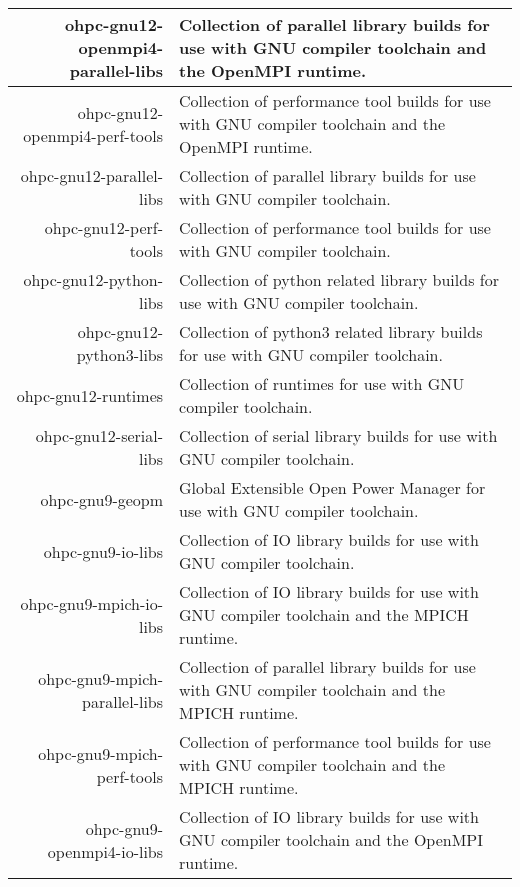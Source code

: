 \begin{tabularx}{\textwidth}{r|X}
\hline
ohpc-gnu12-openmpi4-parallel-libs & Collection of parallel library builds for use with GNU compiler toolchain and the OpenMPI runtime. \\ 
\hline
ohpc-gnu12-openmpi4-perf-tools & Collection of performance tool builds for use with GNU compiler toolchain and the OpenMPI runtime. \\ 
\hline
ohpc-gnu12-parallel-libs & Collection of parallel library builds for use with GNU compiler toolchain. \\ 
\hline
ohpc-gnu12-perf-tools & Collection of performance tool builds for use with GNU compiler toolchain. \\ 
\hline
ohpc-gnu12-python-libs & Collection of python related library builds for use with GNU compiler toolchain. \\ 
\hline
ohpc-gnu12-python3-libs & Collection of python3 related library builds for use with GNU compiler toolchain. \\ 
\hline
ohpc-gnu12-runtimes & Collection of runtimes for use with GNU compiler toolchain. \\ 
\hline
ohpc-gnu12-serial-libs & Collection of serial library builds for use with GNU compiler toolchain. \\ 
\hline
ohpc-gnu9-geopm & Global Extensible Open Power Manager for use with GNU compiler toolchain. \\ 
\hline
ohpc-gnu9-io-libs & Collection of IO library builds for use with GNU compiler toolchain. \\ 
\hline
ohpc-gnu9-mpich-io-libs & Collection of IO library builds for use with GNU compiler toolchain and the MPICH runtime. \\ 
\hline
ohpc-gnu9-mpich-parallel-libs & Collection of parallel library builds for use with GNU compiler toolchain and the MPICH runtime. \\ 
\hline
ohpc-gnu9-mpich-perf-tools & Collection of performance tool builds for use with GNU compiler toolchain and the MPICH runtime. \\ 
\hline
ohpc-gnu9-openmpi4-io-libs & Collection of IO library builds for use with GNU compiler toolchain and the OpenMPI runtime. \\ 
\hline
\bottomrule
\end{tabularx}
